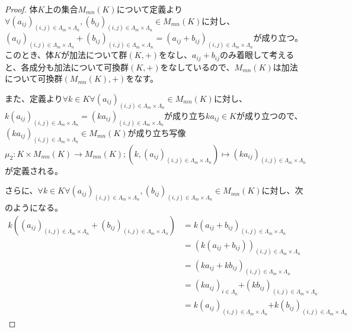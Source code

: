 \documentclass[dvipdfmx]{jsarticle}
\begin{document}
\begin{proof}
体$K$上の集合$M_{mn}(K)$について定義より$\forall\left( a_{ij} \right)_{(i,j) \in \varLambda_{m} \times \varLambda_{n}},\left( b_{ij} \right)_{(i,j) \in \varLambda_{m} \times \varLambda_{n}} \in M_{mn}(K)$に対し、$\left( a_{ij} \right)_{(i,j) \in \varLambda_{m} \times \varLambda_{n}} + \left( b_{ij} \right)_{(i,j) \in \varLambda_{m} \times \varLambda_{n}} = \left( a_{ij} + b_{ij} \right)_{(i,j) \in \varLambda_{m} \times \varLambda_{n}}$が成り立つ。このとき、体$K$が加法について群$(K, + )$をなし、$a_{ij} + b_{ij}$のみ着眼して考えると、各成分も加法について可換群$(K, + )$をなしているので、$M_{mn}(K)$は加法について可換群$\left( M_{mn}(K), + \right)$をなす。\par
また、定義より$\forall k \in K\forall\left( a_{ij} \right)_{(i,j) \in \varLambda_{m} \times \varLambda_{n}} \in M_{mn}(K)$に対し、$k\left( a_{ij} \right)_{(i,j) \in \varLambda_{m} \times \varLambda_{n}} = \left( ka_{ij} \right)_{(i,j) \in \varLambda_{m} \times \varLambda_{n}}$が成り立ち${ka}_{ij} \in K$が成り立つので、$\left( ka_{ij} \right)_{(i,j) \in \varLambda_{m} \times \varLambda_{n}} \in M_{mn}(K)$が成り立ち写像$\mu_{2}:K \times M_{mn}(K) \rightarrow M_{mn}(K);\left( k,\left( a_{ij} \right)_{(i,j) \in \varLambda_{m} \times \varLambda_{n}} \right) \mapsto \left( ka_{ij} \right)_{(i,j) \in \varLambda_{m} \times \varLambda_{n}}$が定義される。\par
さらに、$\forall k \in K\forall\left( a_{ij} \right)_{(i,j) \in \varLambda_{m} \times \varLambda_{n}},\left( b_{ij} \right)_{(i,j) \in \varLambda_{m} \times \varLambda_{n}} \in M_{mn}(K)$に対し、次のようになる。
\begin{align*}
k\left( \left( a_{ij} \right)_{(i,j) \in \varLambda_{m} \times \varLambda_{n}} + \left( b_{ij} \right)_{(i,j) \in \varLambda_{m} \times \varLambda_{n}} \right) &= k\left( a_{ij} + b_{ij} \right)_{(i,j) \in \varLambda_{m} \times \varLambda_{n}}\\
&= \left( k\left( a_{ij} + b_{ij} \right) \right)_{(i,j) \in \varLambda_{m} \times \varLambda_{n}}\\
&= \left( ka_{ij} + kb_{ij} \right)_{(i,j) \in \varLambda_{m} \times \varLambda_{n}}\\
&= \left( ka_{ij} \right)_{i \in \varLambda_{n}}\mathbf{+}\left( kb_{ij} \right)_{(i,j) \in \varLambda_{m} \times \varLambda_{n}}\\
&= k\left( a_{ij} \right)_{(i,j) \in \varLambda_{m} \times \varLambda_{n}}\mathbf{+}k\left( b_{ij} \right)_{(i,j) \in \varLambda_{m} \times \varLambda_{n}}

\end{align*}
\end{proof}
\end{document}
